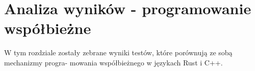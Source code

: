 \chapter{Analiza wyników - programowanie współbieżne}
W tym rozdziale zostały zebrane wyniki testów, które porównują ze sobą mechanizmy progra-
mowania współbieżnego w językach Rust i C++.

